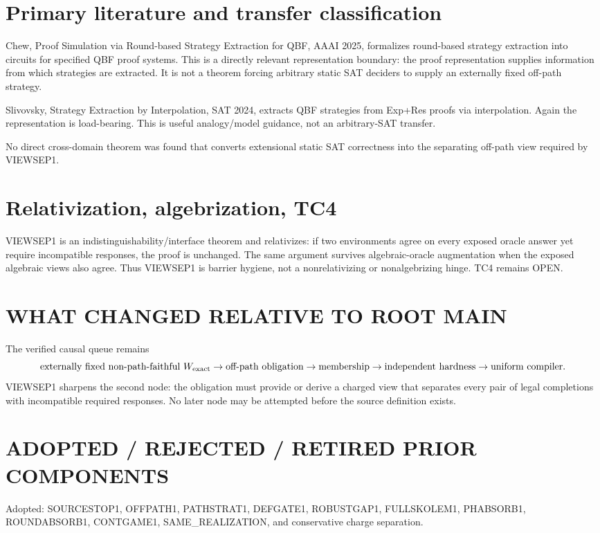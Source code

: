 \documentclass[11pt]{article}
\begin{document}
\section*{Primary literature and transfer classification}
Chew, Proof Simulation via Round-based Strategy Extraction for QBF, AAAI 2025, formalizes round-based strategy extraction into circuits for specified QBF proof systems. This is a directly relevant representation boundary: the proof representation supplies information from which strategies are extracted. It is not a theorem forcing arbitrary static SAT deciders to supply an externally fixed off-path strategy.

Slivovsky, Strategy Extraction by Interpolation, SAT 2024, extracts QBF strategies from Exp+Res proofs via interpolation. Again the representation is load-bearing. This is useful analogy/model guidance, not an arbitrary-SAT transfer.

No direct cross-domain theorem was found that converts extensional static SAT correctness into the separating off-path view required by VIEWSEP1.

\section*{Relativization, algebrization, TC4}
VIEWSEP1 is an indistinguishability/interface theorem and relativizes: if two environments agree on every exposed oracle answer yet require incompatible responses, the proof is unchanged. The same argument survives algebraic-oracle augmentation when the exposed algebraic views also agree. Thus VIEWSEP1 is barrier hygiene, not a nonrelativizing or nonalgebrizing hinge. TC4 remains OPEN.

\section*{WHAT CHANGED RELATIVE TO ROOT MAIN}
The verified causal queue remains
\[
\text{externally fixed non-path-faithful }W_{\rm exact}
\to
\text{off-path obligation}
\to
\text{membership}
\to
\text{independent hardness}
\to
\text{uniform compiler}.
\]
VIEWSEP1 sharpens the second node: the obligation must provide or derive a charged view that separates every pair of legal completions with incompatible required responses. No later node may be attempted before the source definition exists.

\section*{ADOPTED / REJECTED / RETIRED PRIOR COMPONENTS}
Adopted: SOURCESTOP1, OFFPATH1, PATHSTRAT1, DEFGATE1, ROBUSTGAP1, FULLSKOLEM1, PHABSORB1, ROUNDABSORB1, CONTGAME1, SAME_REALIZATION, and conservative charge separation.
\end{document}
